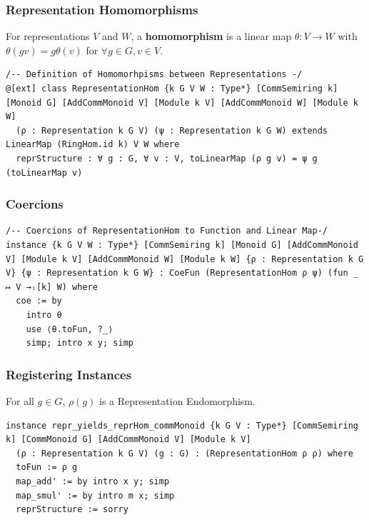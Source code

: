 \documentclass{beamer}
\begin{document}

\begin{frame}[fragile]
\frametitle{Representation Homomorphisms}
\begin{definition}
For representations \(V\) and \(W\), a \textbf{homomorphism} is a linear map \(\theta: V\to W\) with \(\theta(gv) = g\theta(v)\) for \(\forall g\in G, v\in V\).
\end{definition}
\pause
\begin{lstlisting}
/-- Definition of Homomorhpisms between Representations -/
@[ext] class RepresentationHom {k G V W : Type*} [CommSemiring k] [Monoid G] [AddCommMonoid V] [Module k V] [AddCommMonoid W] [Module k W]
  (ρ : Representation k G V) (ψ : Representation k G W) extends LinearMap (RingHom.id k) V W where
  reprStructure : ∀ g : G, ∀ v : V, toLinearMap (ρ g v) = ψ g (toLinearMap v)
\end{lstlisting}
\end{frame}


\begin{frame}[fragile]
\frametitle{Coercions}
\begin{lstlisting}
/-- Coercions of RepresentationHom to Function and Linear Map-/
instance {k G V W : Type*} [CommSemiring k] [Monoid G] [AddCommMonoid V] [Module k V] [AddCommMonoid W] [Module k W] {ρ : Representation k G V} {ψ : Representation k G W} : CoeFun (RepresentationHom ρ ψ) (fun _ ↦ V →ₗ[k] W) where
  coe := by
    intro θ
    use ⟨θ.toFun, ?_⟩
    simp; intro x y; simp
\end{lstlisting}
\end{frame}


\begin{frame}[fragile]
\frametitle{Registering Instances}
\begin{lemma}
For all \(g \in G\), \(\rho(g)\) is a Representation Endomorphism.
\end{lemma}
\pause
\begin{lstlisting}
instance repr_yields_reprHom_commMonoid {k G V : Type*} [CommSemiring k] [CommMonoid G] [AddCommMonoid V] [Module k V]
  (ρ : Representation k G V) (g : G) : (RepresentationHom ρ ρ) where
  toFun := ρ g
  map_add' := by intro x y; simp
  map_smul' := by intro m x; simp
  reprStructure := sorry
\end{lstlisting}
\end{frame}
\end{document}
